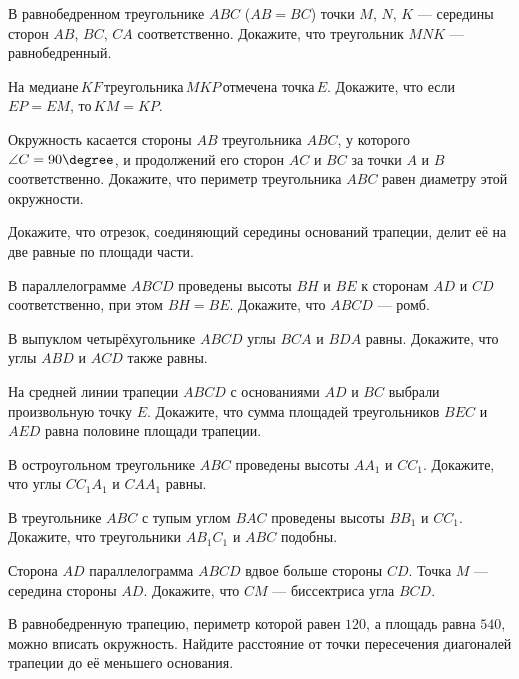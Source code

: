 \begin{class}[number=7]
	\begin{listofex}
		\item В равнобедренном треугольнике \( ABC \) (\( AB=BC \)) точки \( M \), \( N \), \( K \) --- середины сторон \( AB \), \( BC \), \( CA \) соответственно. Докажите, что треугольник \( MNK \) --- равнобедренный.
		\item На медиане \( KF \) треугольника \( MKP \) отмечена точка \( E \). Докажите, что если \( EP=EM \), то \( KM=KP \).
		\item Окружность касается стороны \( AB \) треугольника \( ABC \), у которого \( \angle C=90\degree \), и продолжений его сторон \( AC \) и \( BC \) за точки \( A \) и \( B \) соответственно. Докажите, что периметр треугольника \( ABC \) равен диаметру этой окружности.
		\item Докажите, что отрезок, соединяющий середины оснований трапеции, делит её на две равные по площади части.
		\item В параллелограмме \( ABCD \) проведены высоты \( BH \) и \( BE \) к сторонам \( AD \) и \( CD \) соответственно, при этом \( BH=BE \). Докажите, что \( ABCD \) --- ромб.
	\end{listofex}
\end{class}

\begin{class}[number=8]
	\begin{listofex}
		\item В выпуклом четырёхугольнике \( ABCD \) углы \( BCA \)	и \( BDA \) равны. Докажите, что углы \( ABD \) и \( ACD \) также равны.
		\item На средней линии трапеции \( ABCD \) с основаниями \( AD \) и \( BC \) выбрали произвольную точку \( E \). Докажите, что сумма площадей треугольников \( BEC \) и \( AED \) равна половине площади трапеции.
		\item В остроугольном треугольнике \( ABC \) проведены высоты \( AA_1 \) и \( CC_1 \). Докажите, что углы \( CC_1A_1 \) и \( CAA_1 \) равны.
		\item В треугольнике \( ABC \) с тупым углом \( BAC \) проведены высоты \( BB_1 \) и \( CC_1 \). Докажите, что треугольники \( AB_1C_1 \) и \( ABC \) подобны.
		\item Сторона \( AD \) параллелограмма \( ABCD \) вдвое больше стороны \( CD \). Точка \( M \) --- середина стороны \( AD \). Докажите, что \( CM \) --- биссектриса угла \( BCD \).
		\item В равнобедренную трапецию, периметр которой равен \( 120 \), а площадь равна \( 540 \), можно вписать окружность. Найдите расстояние от точки пересечения диагоналей трапеции до её меньшего основания.
	\end{listofex}
\end{class}

